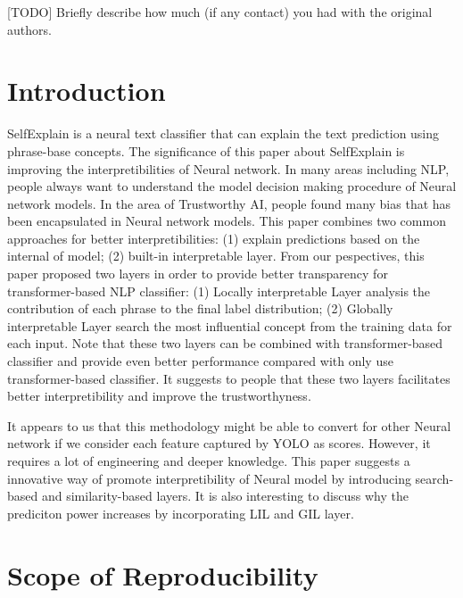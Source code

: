 \documentclass{article}
\begin{document}
[TODO] Briefly describe how much (if any contact) you had with the original authors.

\newpage


\section{Introduction}

SelfExplain is a neural text classifier that can explain the text prediction using phrase-base concepts.
The significance of this paper about SelfExplain is improving the interpretibilities of Neural 
network. In many areas including NLP, people always want to understand the model decision making
procedure of Neural network models. In the area of Trustworthy AI, people found many bias 
that has been encapsulated in Neural network models. This paper combines two common approaches 
for better interpretibilities: (1) explain predictions based on the internal of model; (2) built-in 
interpretable layer. From our pespectives, this paper proposed two layers in order to provide 
better transparency for transformer-based NLP classifier: (1) Locally interpretable Layer 
analysis the contribution of each phrase to the final label distribution; (2) Globally interpretable 
Layer search the most influential concept from the training data for each input. Note that 
these two layers can be combined with transformer-based classifier and provide even better 
performance compared with only use transformer-based classifier. It suggests to people that 
these two layers facilitates better interpretibility and improve the trustworthyness.

It appears to us that this methodology might be able to convert for other Neural network if we 
consider each feature captured by YOLO as scores. However, it requires a lot of engineering and 
deeper knowledge. This paper suggests a innovative way of promote interpretibility of Neural 
model by introducing search-based and similarity-based layers. It is also interesting to discuss 
why the prediciton power increases by incorporating LIL and GIL layer.

\section{Scope of Reproducibility}
\end{document}
